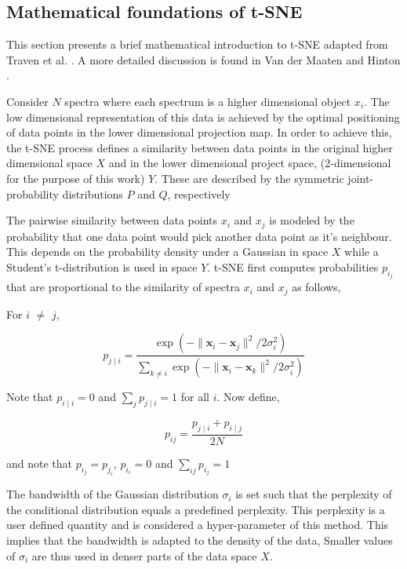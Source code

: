 \subsection{Mathematical foundations of t-SNE}

This section presents a brief mathematical introduction to t-SNE adapted from Traven et al. \cite{traven2017galah}. A more detailed discussion is found in Van der Maaten and Hinton \cite{van2008visualizing}. 

Consider $N$ spectra where each spectrum is a higher dimensional object $x_i$. The low dimensional representation of this data is achieved by the optimal positioning of data points in the lower dimensional projection map. In order to achieve this, the t-SNE process defines a similarity between data points in the original higher dimensional space $X$ and in the lower dimensional project space, (2-dimensional for the purpose of this work) $Y$. These are described by the symmetric joint-
probability distributions $P$ and $Q$, respectively

The pairwise similarity between data points $x_i$ and $x_j$ is modeled by the probability that one data point would pick another data point as it's neighbour. This depends on the probability density under a Gaussian in space $X$ while a Student's t-distribution is used in space $Y$. t-SNE first computes probabilities $p_i_j$ that are proportional to the similarity of spectra $x_i$ and $x_j$ as follows,


For $i$ $\neq$ $j$,

\begin{equation}
p_{j\mid i}={\frac {\exp(-\lVert \mathbf {x} _{i}-\mathbf {x} _{j}\rVert ^{2}/2\sigma _{i}^{2})}{\sum _{k\neq i}\exp(-\lVert \mathbf {x} _{i}-\mathbf {x} _{k}\rVert ^{2}/2\sigma _{i}^{2})}}
\end{equation}

Note that $p_{i\mid i}=0$ and $\sum _{j}p_{j\mid i}=1$ for all $i$. Now define,

\begin{equation}
    p_{ij}={\frac {p_{j\mid i}+p_{i\mid j}}{2N}}
\end{equation}

and note that $p_i_j=p_j_i$, $p_i_i=0$ and $\sum _{ij} p_i_j=1$

The bandwidth of the Gaussian distribution $\sigma_i$ is set such that the perplexity of the conditional distribution equals a predefined perplexity. This perplexity is a user defined quantity and is considered a hyper-parameter of this method. This implies that the bandwidth is adapted to the density of the data, Smaller values of $\sigma_i$ are thus used in denser parts of the data space $X$. 

